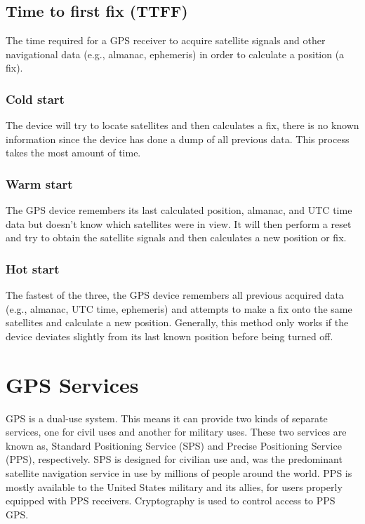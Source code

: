 \documentclass[conference]{IEEEtran}
\begin{document}
\subsection{Time to first fix (TTFF)}

The time required for a GPS receiver to acquire satellite signals and other navigational data (e.g., almanac, ephemeris) in order to calculate a position (a fix).


\subsubsection{\textbf{Cold start}}

The device will try to locate satellites and then calculates a fix, there is no known information since the device has done a dump of all previous data. This process takes the most amount of time.

\subsubsection{\textbf{Warm start}}

The GPS device remembers its last calculated position, almanac, and UTC time data but doesn't know which satellites were in view. It will then perform a reset and try to obtain the satellite signals and then calculates a new position or fix.

\subsubsection{\textbf{Hot start}}

The fastest of the three, the GPS device remembers all previous acquired data (e.g., almanac, UTC time, ephemeris) and attempts to make a fix onto the same satellites and calculate a new position. Generally, this method only works if the device deviates slightly from its last known position before being turned off.

\section{GPS Services}

GPS is a dual-use system. This means it can provide two kinds of separate services, one for civil uses and another for military uses. These two services are known as, Standard Positioning Service (SPS) and Precise Positioning Service (PPS), respectively. SPS is designed for civilian use and, was the predominant satellite navigation service in use by millions of people around the world. PPS is mostly available to the United States military and its allies, for users properly equipped with PPS receivers. Cryptography is used to control access to PPS GPS.
\end{document}
